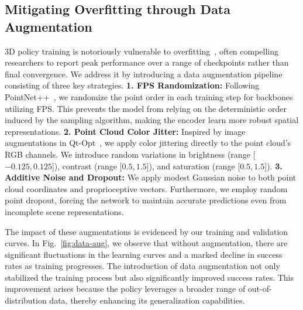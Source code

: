 \documentclass[runningheads]{llncs}
\begin{document}
\subsection{Mitigating Overfitting through Data Augmentation}\label{fix_overfitting_issue}
3D policy training is notoriously vulnerable to overfitting~\cite{ze20243d}, often compelling researchers to report peak performance over a range of checkpoints rather than final convergence. We address it by introducing a data augmentation pipeline consisting of three key strategies.
\textbf{1. FPS Randomization:}
Following PointNet++~\cite{qi2017pointnet++}, we randomize the point order in each training step for backbones utilizing FPS. This prevents the model from relying on the deterministic order induced by the sampling algorithm, making the encoder learn more robust spatial representations. \textbf{2. Point Cloud Color Jitter:} Inspired by image augmentations in Qt-Opt~\cite{kalashnikov2018qtoptscalabledeepreinforcement}, we apply color jittering directly to the point cloud's RGB channels. We introduce random variations in brightness (range [$-0.125, 0.125$]), contrast (range [$0.5, 1.5$]), and saturation (range [$0.5, 1.5$]). \textbf{3. Additive Noise and Dropout:} We apply modest Gaussian noise to both point cloud coordinates and proprioceptive vectors. Furthermore, we employ random point dropout, forcing the network to maintain accurate predictions even from incomplete scene representations.

The impact of these augmentations is evidenced by our training and validation curves. In Fig.~\ref{fig:data-aug}, we observe that without augmentation, there are significant fluctuations in the learning curves and a marked decline in success rates as training progresses. The introduction of data augmentation not only stabilized the training process but also significantly improved success rates. This improvement arises because the policy leverages a broader range of out-of-distribution data, thereby enhancing its generalization capabilities.

\end{document}
